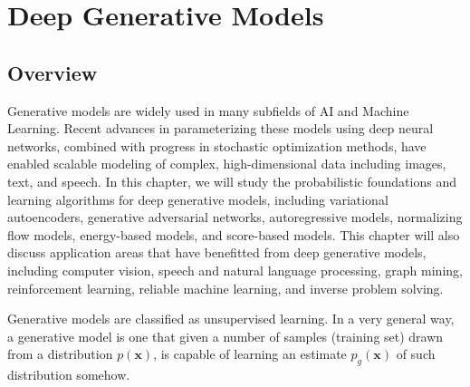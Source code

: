 ﻿


\newcommand{\D}{\mathcal{D}}
\newcommand{\KL}[2]{D_\mathrm{KL}\paren{#1 \mathbin{\|} #2}}
\renewcommand{\P}{\mathcal{P}}
\newcommand{\X}{\mathcal{X}}
\newcommand{\Z}{\mathcal{Z}}
\newcommand{\Q}{\mathcal{Q}}
\newcommand{\bb}{\mathbf{b}}
\newcommand{\bc}{\mathbf{c}}
\newcommand{\bh}{\mathbf{h}}
\newcommand{\bv}{\mathbf{v}}
\newcommand{\bx}{\mathbf{x}}
\newcommand{\bz}{\mathbf{z}}
\newcommand{\M}{\mathcal{B}}
\newcommand{\ELBO}{\mathrm{ELBO}}
\newcommand{\giv}{\mid}
\newcommand{\paren}[1]{\left(#1\right)}
\newcommand{\brac}[1]{\left[#1\right]}
\newcommand{\veps}{\varepsilon}
\newcommand{\set}[1]{\left\{#1\right\}}
\renewcommand{\d}{\mathop{}\!\mathrm{d}}
\newcommand{\Expect}{\mathbb{E}}
\newcommand{\Normal}{\mathcal{N}}
\newcommand{\I}{\mathbf{I}}
\newcommand{\0}{\mathbf{0}}


\chapter{Deep Generative Models}
\setcounter{section}{-1}

\section{Overview}

Generative models are widely used in many subfields of AI and Machine Learning. Recent 
advances in parameterizing these models using deep neural networks, combined with 
progress in stochastic optimization methods, have enabled scalable modeling of complex, 
high-dimensional data including images, text, and speech. In this chapter, we will 
study the probabilistic foundations and learning algorithms for deep generative models, 
including variational autoencoders, generative adversarial networks, autoregressive 
models, normalizing flow models, energy-based models, and score-based models. This 
chapter will also discuss application areas that have benefitted from deep generative 
models, including computer vision, speech and natural language processing, graph mining, 
reinforcement learning, reliable machine learning, and inverse problem solving.

Generative models are classified as unsupervised learning. In a very general way, a
generative model is one that given a number of samples (training set) drawn from a 
distribution $p(\bx)$, is capable of learning an estimate $p_g(\bx)$ of such distribution 
somehow.

